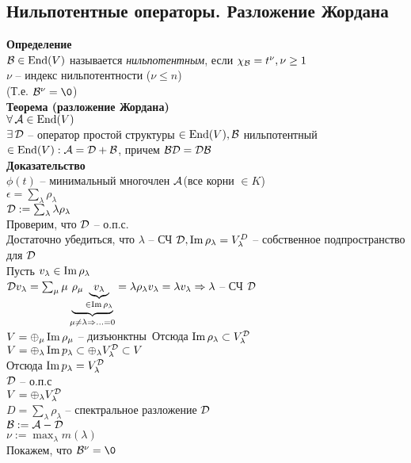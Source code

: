 \documentclass[12pt]{article}
\begin{document}
\subsection{Нильпотентные операторы. Разложение Жордана}
\textbf{Определение}\\
$\mcB \in \nm{End}(V)$ называется \textit{нильпотентным}, если $\chi_\mcB = t^\nu, \nu \geq 1$\\
$\nu$ -- индекс нильпотентности ($\nu \leq n$)\\
(Т.е. $\mcB^\nu = \0$)\\
\textbf{Теорема (разложение Жордана)}\\
$\fall \mcA \in \nm{End}(V)$\\
$\ex \mc{D}$ -- оператор простой структуры $\in \nm{End}(V), \mcB$ нильпотентный $\in \nm{End}(V): \mcA = \mc D + \mcB$, причем $\mcB \mc D = \mc D \mcB$\\
\textbf{Доказательство}\\
$\phi(t)$ -- минимальный многочлен $\mcA$(все корни $\in K$)\\
$\epsilon = \sum_\lambda \rho_\lambda$\\
$\mcD:= \sum_\lambda \lambda \rho_\lambda$\\
Проверим, что $\mcD$ -- о.п.с.\\
Достаточно убедиться, что $\lambda$ -- СЧ $\mcD, \im \rho_\lambda = V_\lambda^D$ -- собственное подпространство для $\mcD$\\
Пусть $v_\lambda \in \im \rho_\lambda$\\
$\mcD v_\lambda = \sum_\mu \mu \ub{\mu \neq \lambda \Rto \ldots = 0}{\rho_\mu \ub{\in \im \rho_\lambda}{v_\lambda}} = \lambda \rho_\lambda v_\lambda = \lambda v_\lambda \Rto \lambda$ -- СЧ $\mcD$\\
$V = \oplus_\mu \im \rho_\mu$ -- дизъюнктны\
Отсюда $\im \rho_\lambda \subset V_\lambda^\mcD$\\
$V = \oplus_\lambda \im p_\lambda \subset \oplus_\lambda V_\lambda^\mcD \subset V$\\
Отсюда $\im p_\lambda = V_\lambda^\mcD$\\
$\mcD$ -- о.п.с\\
$V = \oplus_\lambda V_\lambda^\mcD$\\
$D = \sum_\lambda \rho_\lambda$ -- спектральное разложение $\mcD$\\
$\mcB := \mcA - \mcD$\\
$\nu := \max_\lambda m(\lambda)$\\
Покажем, что $\mcB^\nu = \0$\\
\end{document}
